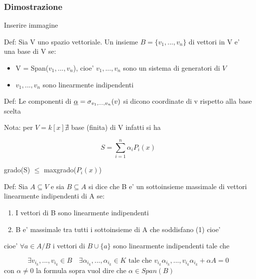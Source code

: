 \documentclass{article}
\begin{document}
\subsubsection*{Dimostrazione}
\begin{flushleft}
	Inserire immagine
\end{flushleft}
\begin{flushleft}
	Def: Sia V uno spazio vettoriale. Un insieme $B = \{ v_1,...,v_n \}$ di vettori in V e' una base di V se:
\end{flushleft}
\begin{itemize}
	\item V = Span($v_1,...,v_n$), cioe' $v_1,...,v_n$ sono un sistema di generatori di $V$
	\item $v_1,...,v_n$ sono linearmente indipendenti
\end{itemize}
\begin{flushleft}
	Def: Le componenti di $\underbar{$\alpha$} = \sigma_{v_1,...,v_n}(v)$ si dicono coordinate di v rispetto alla base scelta
\end{flushleft}
\begin{flushleft}
	Nota: per $V=k[x] \nexists $ base (finita) di V infatti si ha
\end{flushleft}
\begin{equation*}
	S=\sum_{i=1}^n \alpha_i P_i(x)
\end{equation*}
\begin{flushleft}
	grado(S) $\leq$ max{grado($P_i(x)$)}
\end{flushleft}
\begin{flushleft}
	Def: Sia $A \subseteq V$ e sia $B \subseteq A$ si dice che B e' un sottoinsieme massimale di vettori linearmente indipendenti di A se:
\end{flushleft}
\begin{enumerate}
	\item I vettori di B sono linearmente indipendenti
	\item B e' massimale tra tutti i sottoinsieme di A che soddisfano (1) cioe'
\end{enumerate}

\begin{flushleft}
	cioe' $\forall a \in A /B$ i vettori di $B \cup \{ a\}$ sono linearmente indipendenti tale che
\end{flushleft}
\begin{equation*}
	\exists v_{i_k},...,v_{i_k} \in B \quad
	\exists \alpha_{i_k},...,\alpha_{i_k} \in K \text{ tale che }
	v_{i_k}\alpha_{i_k},...,v_{i_k}\alpha_{i_k}+ \alpha A =0
\end{equation*}
con $\alpha \neq 0$ la formula sopra vuol dire che $\alpha \in Span(B)$
\end{document}
